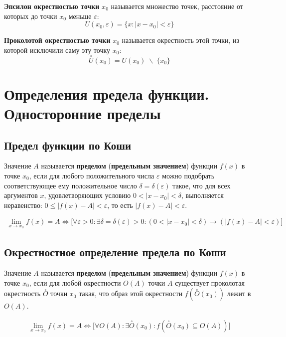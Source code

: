 \documentclass[a4paper,12pt]{extbook}
\theoremstyle{named}
\theoremstyle{named}
\begin{document}
\textbf{Эпсилон окрестностью точки} \(x_0\) называется множество точек, расстояние от которых до точки \(x_0\) меньше \(\varepsilon\):
\[
    U(x_0, \varepsilon) = \{x: |x - x_0| < \varepsilon\}
\]

\textbf{Проколотой окрестностью точки} \(x_0\) называется окрестность этой точки, из которой исключили саму эту точку \(x_0\):
\[
    \overset{\circ}{U}(x_0) = U(x_0) \; \backslash \; \{x_0\}
\]

\section{Определения предела функции. Односторонние пределы}%
\label{sec:Определения предела функции. Односторонние пределы}

\subsection*{Предел функции по Коши}%
\label{sub:Предел функции по Коши}

Значение \(A\) называется \textbf{пределом} (\textbf{предельным значением}) функции \(f(x)\) в точке \(x_0\), если для любого положительного числа \(\varepsilon\) можно подобрать соответствующее ему положительное число \(\delta = \delta (\varepsilon)\) такое, что для всех аргументов \(x\), удовлетворяющих условию \(0 < |x - x_0| < \delta\), выполняется неравенство: \(0 \leq |f(x) - A| < \varepsilon\), то есть \(|f(x) -A| < \varepsilon\).

\begin{gather*}
    \lim_{x \to x_0}{f(x)} = A \iff \Big[ \forall \varepsilon > 0: \exists \delta = \delta (\varepsilon) > 0: (0 < |x - x_0| < \delta) \to (|f(x) - A| < \varepsilon) \Big]
\end{gather*}

\subsection*{Окрестностное определение предела по Коши}
Значение \(A\) называется \textbf{пределом} (\textbf{предельным значением}) функции \(f(x)\) в точке \(x_0\), если для любой окрестности \(O(A)\) точки \(A\) существует проколотая окрестность \(\overset{\circ}{O}\) точки \(x_0\) такая, что образ этой окрестности \(f(\overset{\circ}{O}(x_0))\) лежит в \(O(A)\).

\begin{gather*}
    \lim_{x \to x_0}{f(x)} = A \iff \Big[ \forall O(A): \exists \overset{\circ}{O}(x_0): f(\overset{\circ}{O}(x_0) \subseteq O(A)) \Big]
\end{gather*}
\end{document}
